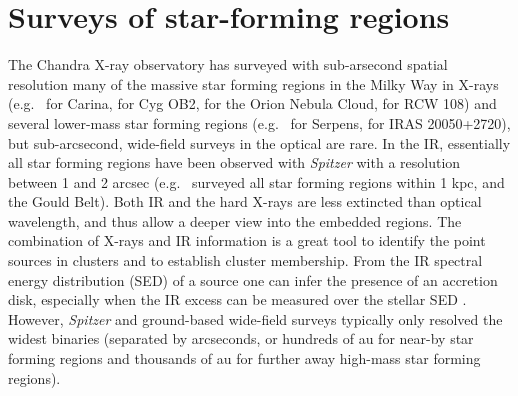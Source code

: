 \documentclass[12pt]{article}
\begin{document}
\section{Surveys of star-forming regions}
The Chandra X-ray observatory has surveyed with sub-arsecond spatial resolution  many of the massive star forming regions in the Milky Way
in X-rays (e.g.\ \citealt{2011ApJS..194....1T} for Carina,
\citealt{2010ApJ...713..871W} for Cyg OB2, \citealt{2005ApJS..160..379F} for
the Orion Nebula Cloud, \citealt{2008AJ....135..693W} for RCW 108) and 
several lower-mass star forming regions
(e.g.\ \citealt{2018AJ....155..241W} for Serpens, \citealt{2012AJ....144..101G}
for IRAS 20050+2720), but sub-arcsecond, wide-field surveys in the optical are rare.
In the IR, essentially
all star forming regions have been observed with \emph{Spitzer} with a resolution between 1 and 2 arcsec
(e.g.\ \citealt{2009ApJS..184...18G} surveyed all star forming regions within 1
kpc, and \citealt{2015ApJS..220...11D} the Gould Belt). Both IR and the hard
X-rays are less extincted than optical wavelength, and thus allow a
deeper view into the embedded regions. The combination of X-rays and IR information
is a great tool to identify the point sources in clusters and to establish
cluster membership. From the IR spectral energy distribution (SED) of a source one can
infer the presence of an accretion disk, especially when the IR excess can be measured over the stellar SED \citep{2009ApJS..184...18G}. However, \emph{Spitzer} and ground-based wide-field surveys typically only resolved the widest binaries (separated by arcseconds, or hundreds of au for near-by star forming regions and thousands of au for further away high-mass star forming regions).
\end{document}
